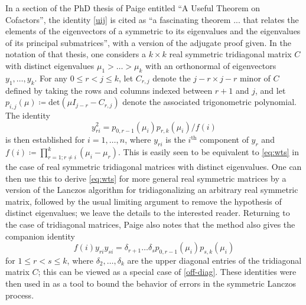 \documentclass[12pt]{amsart}
\begin{document}
In a section \cite[Section 8.2]{paige_1971} of the PhD thesis of Paige entitled ``A Useful Theorem on Cofactors'', the identity \eqref{uij} is cited as ``a fascinating theorem ... that relates the elements of the eigenvectors of a symmetric to its eigenvalues and the eigenvalues of its principal submatrices'', with a version of the adjugate proof given.  In the notation of that thesis, one considers a $k \times k$ real symmetric tridiagonal matrix $C$ with distinct eigenvalues $\mu_1 > \dots > \mu_k$ with an orthonormal of eigenvectors $y_1,\dots,y_k$.  For any $0 \leq r < j \leq k$, let $C_{r,j}$ denote the $j-r \times j-r$ minor of $C$ defined by taking the rows and columns indexed between $r+1$ and $j$, and let $p_{i,j}(\mu) \coloneqq \mathrm{det}( \mu I_{j-r} - C_{r,j} )$ denote the associated trigonometric polynomial.  The identity
\begin{equation}\label{yri} y_{ri}^2 = p_{0,r-1}(\mu_i) p_{r,k}(\mu_i) / f(i)
\end{equation}
is then established for $i=1,\dots,n$, where $y_{ri}$ is the $i^{\mathrm{th}}$ component of $y_r$ and $f(i) \coloneqq \prod_{r=1; r \neq i}^k (\mu_i-\mu_r)$.  This is easily seen to be equivalent to \eqref{eq:wts} in the case of real symmetric tridiagonal matrices with distinct eigenvalues.  One can then use this to derive \eqref{eq:wts} for more general real symmetric matrices by a version of the Lanczos algorithm for tridiagonalizing an arbitrary real symmetric matrix, followed by the usual limiting argument to remove the hypothesis of distinct eigenvalues; we leave the details to the interested reader.  Returning to the case of tridiagonal matrices, Paige also notes that the method also gives the companion identity
\begin{equation}\label{yri-2}
 f(i) y_{ri} y_{si} = \delta_{r+1} \dots \delta_s p_{0,r-1}(\mu_i) p_{s,k}(\mu_i)
\end{equation}
for $1 \leq r < s \leq k$, where $\delta_2,\dots,\delta_k$ are the upper diagonal entries of the tridiagonal matrix $C$; this can be viewed as a special case of \eqref{off-diag}.  These identities were then used in \cite[Section 8]{paige_1971} as a tool to bound the behavior of errors in the symmetric Lanczos process.
\end{document}
